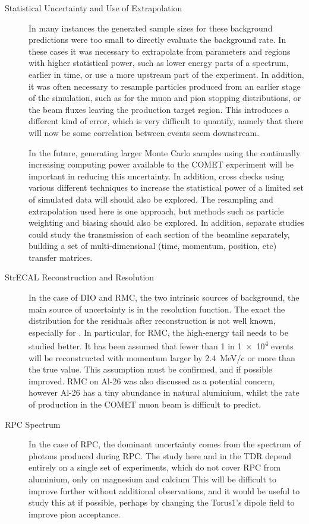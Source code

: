 \begin{description}
\item[Statistical Uncertainty and Use of Extrapolation]
In many instances the generated sample sizes for these background predictions were too small to directly evaluate the background rate.
In these cases it was necessary to extrapolate from parameters and regions with higher statistical power, such as lower energy parts of a spectrum, earlier in time, or use a more upstream part of the experiment.
In addition, it was often necessary to resample particles produced from an earlier stage of the simulation, such as for the muon and pion stopping distributions, or the beam fluxes leaving the production target region.
This introduces a different kind of error, which is very difficult to quantify, namely that there will now be some correlation between events seem downstream.

In the future, generating larger Monte Carlo samples using the continually increasing computing power available to the COMET experiment will be important in reducing this uncertainty.
In addition, cross checks using various different techniques to increase the statistical power of a limited set of simulated data will should also be explored.
The resampling and extrapolation used here is one approach, but methods such as particle weighting and biasing should also be explored.
In addition, separate studies could study the transmission of each section of the beamline separately, building a set of multi-dimensional (time, momentum, position, etc) transfer matrices.

\item[StrECAL Reconstruction and Resolution]
In the case of \ac{DIO} and \ac{RMC}, the two intrinsic sources of background, the main source of uncertainty is in the resolution function.
The exact the distribution for the residuals after reconstruction is not well known, especially for \phaseII.
In particular, for \ac{RMC}, the high-energy tail needs to be studied better. 
It has been assumed that fewer than 1 in \num{1e4} events will be reconstructed with momentum larger by 2.4~MeV/c or more than the true value.
This assumption must be confirmed, and if possible improved.
RMC on Al-26 was also discussed as a potential concern, however Al-26 has a tiny abundance in natural aluminium, whilst the rate of production in the COMET muon beam is difficult to predict.

\item[RPC Spectrum]
In the case of \acf{RPC}, the dominant uncertainty comes from the spectrum of photons produced during RPC.
The study here and in the \phaseI TDR depend entirely on a single set of experiments, which do not cover RPC from aluminium, only on magnesium and calcium
This will be difficult to improve further without additional observations, and it would be useful to study this at \phaseI if possible, perhaps by changing the Torus1's dipole field to improve pion acceptance.


\end{description}
